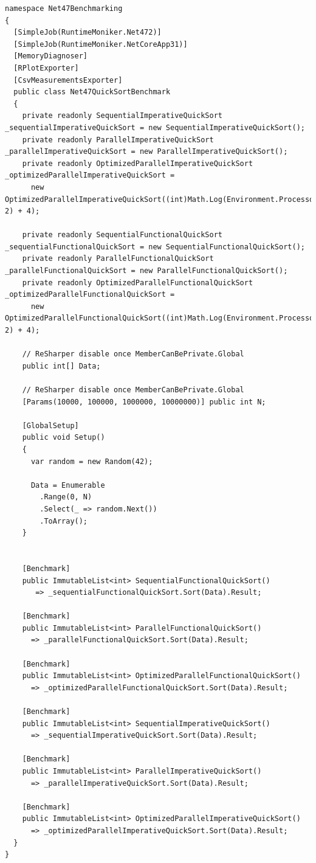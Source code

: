 \begin{lstlisting}[language={[sharp]c}, style=sharpcstyle, caption={Quicksort benchmark class}, label={lst:QSBenchClass}]
namespace Net47Benchmarking
{
  [SimpleJob(RuntimeMoniker.Net472)]
  [SimpleJob(RuntimeMoniker.NetCoreApp31)]
  [MemoryDiagnoser]
  [RPlotExporter]
  [CsvMeasurementsExporter]
  public class Net47QuickSortBenchmark
  {
    private readonly SequentialImperativeQuickSort _sequentialImperativeQuickSort = new SequentialImperativeQuickSort();
    private readonly ParallelImperativeQuickSort _parallelImperativeQuickSort = new ParallelImperativeQuickSort();
    private readonly OptimizedParallelImperativeQuickSort _optimizedParallelImperativeQuickSort =
      new OptimizedParallelImperativeQuickSort((int)Math.Log(Environment.ProcessorCount, 2) + 4);

    private readonly SequentialFunctionalQuickSort _sequentialFunctionalQuickSort = new SequentialFunctionalQuickSort();
    private readonly ParallelFunctionalQuickSort _parallelFunctionalQuickSort = new ParallelFunctionalQuickSort();
    private readonly OptimizedParallelFunctionalQuickSort _optimizedParallelFunctionalQuickSort =
      new OptimizedParallelFunctionalQuickSort((int)Math.Log(Environment.ProcessorCount, 2) + 4);

    // ReSharper disable once MemberCanBePrivate.Global
    public int[] Data;

    // ReSharper disable once MemberCanBePrivate.Global
    [Params(10000, 100000, 1000000, 10000000)] public int N;

    [GlobalSetup]
    public void Setup()
    {
      var random = new Random(42);

      Data = Enumerable
        .Range(0, N)
        .Select(_ => random.Next())
        .ToArray();
    }


    [Benchmark]
    public ImmutableList<int> SequentialFunctionalQuickSort()
       => _sequentialFunctionalQuickSort.Sort(Data).Result;

    [Benchmark]
    public ImmutableList<int> ParallelFunctionalQuickSort()
      => _parallelFunctionalQuickSort.Sort(Data).Result;

    [Benchmark]
    public ImmutableList<int> OptimizedParallelFunctionalQuickSort()
      => _optimizedParallelFunctionalQuickSort.Sort(Data).Result;

    [Benchmark]
    public ImmutableList<int> SequentialImperativeQuickSort()
      => _sequentialImperativeQuickSort.Sort(Data).Result;

    [Benchmark]
    public ImmutableList<int> ParallelImperativeQuickSort()
      => _parallelImperativeQuickSort.Sort(Data).Result;

    [Benchmark]
    public ImmutableList<int> OptimizedParallelImperativeQuickSort()
      => _optimizedParallelImperativeQuickSort.Sort(Data).Result;
  }
}
\end{lstlisting}


